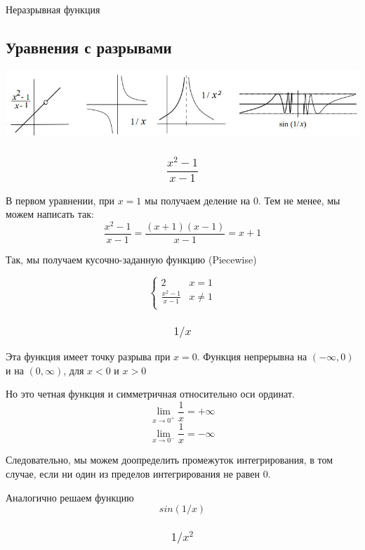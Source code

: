 \documentclass[11pt, english]{article}
\begin{document}
Неразрывная функция

\subsection{Уравнения с разрывами}
\begin{center}
    \includegraphics[width=15cm]{functions.jpg}
\end{center}

\subsubsection{$$\frac{x^2 - 1}{x - 1}$$}

В первом уравнении, при $x = 1$ мы получаем деление на $0$. Тем не менее, мы можем написать так:
$$\frac{x^2 - 1}{x - 1} = \frac{(x+1)(x-1)}{x-1} = x + 1$$

Так, мы получаем кусочно-заданную функцию (Piecewise)

\[ \begin{cases} 
      2 & x = 1 \\
      \frac{x^2 - 1}{x - 1} & x \neq 1 \\
   \end{cases}
\]

\subsubsection{$$1/x$$}
Эта функция имеет точку разрыва при $x = 0$. Функция непрерывна на $(-\infty, 0)$ и на $(0, \infty)$, для $x < 0$ и $x > 0$

Но это четная функция и симметричная относительно оси ординат. 
$$\lim_{x \rightarrow 0^+} \frac{1}{x} = + \infty$$
$$\lim_{x \rightarrow 0^-} \frac{1}{x} = - \infty$$

Следовательно, мы можем доопределить промежуток интегрирования, в том случае, если ни один из пределов интегрирования не равен $0$.

Аналогично решаем функцию $$sin(1/x)$$

\subsubsection{$$1/x^2$$}
\end{document}
